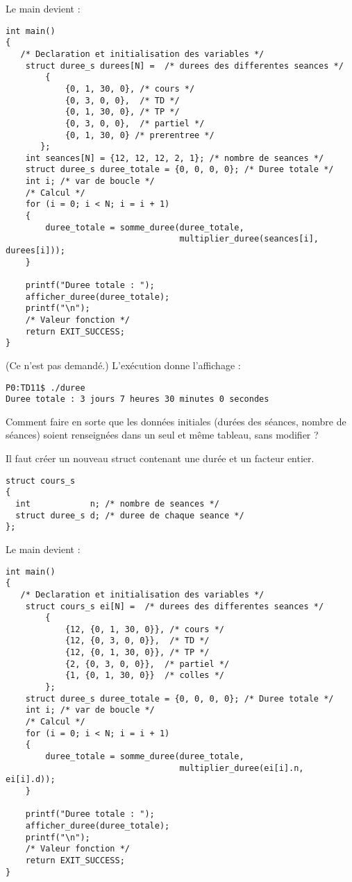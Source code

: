 \begin{newenu}
  \begin{correction}
Le main devient :
{\footnotesize
\begin{verbatim}
int main()
{
   /* Declaration et initialisation des variables */
    struct duree_s durees[N] =  /* durees des differentes seances */
        {
            {0, 1, 30, 0}, /* cours */
            {0, 3, 0, 0},  /* TD */
            {0, 1, 30, 0}, /* TP */
            {0, 3, 0, 0},  /* partiel */
            {0, 1, 30, 0} /* prerentree */
       };
    int seances[N] = {12, 12, 12, 2, 1}; /* nombre de seances */
    struct duree_s duree_totale = {0, 0, 0, 0}; /* Duree totale */
    int i; /* var de boucle */
    /* Calcul */
    for (i = 0; i < N; i = i + 1)
    {
        duree_totale = somme_duree(duree_totale, 
                                   multiplier_duree(seances[i], durees[i]));
    }

    printf("Duree totale : ");
    afficher_duree(duree_totale);
    printf("\n");
    /* Valeur fonction */
    return EXIT_SUCCESS;
}
\end{verbatim}
}

(Ce n'est pas demandé.) L'exécution donne l'affichage :
{\footnotesize
\begin{verbatim}
P0:TD11$ ./duree 
Duree totale : 3 jours 7 heures 30 minutes 0 secondes
\end{verbatim}
}
\end{correction}

\item Comment faire en sorte que les données initiales (durées des
  séances, nombre de séances) soient renseignées dans un seul et même
  tableau, sans modifier  ?
  \begin{correction}
    Il faut créer un nouveau struct contenant une durée et un facteur
    entier.
\begin{verbatim}
struct cours_s
{
  int            n; /* nombre de seances */ 
  struct duree_s d; /* duree de chaque seance */
};
\end{verbatim}
Le main devient :
{\footnotesize
\begin{verbatim}
int main()
{
   /* Declaration et initialisation des variables */
    struct cours_s ei[N] =  /* durees des differentes seances */
        {
            {12, {0, 1, 30, 0}}, /* cours */
            {12, {0, 3, 0, 0}},  /* TD */
            {12, {0, 1, 30, 0}}, /* TP */
            {2, {0, 3, 0, 0}},  /* partiel */
            {1, {0, 1, 30, 0}}  /* colles */
        };
    struct duree_s duree_totale = {0, 0, 0, 0}; /* Duree totale */
    int i; /* var de boucle */
    /* Calcul */
    for (i = 0; i < N; i = i + 1)
    {
        duree_totale = somme_duree(duree_totale, 
                                   multiplier_duree(ei[i].n, ei[i].d));
    }

    printf("Duree totale : ");
    afficher_duree(duree_totale);
    printf("\n");
    /* Valeur fonction */
    return EXIT_SUCCESS;
}
\end{verbatim}
}
  \end{correction}
  \end{newenu}

